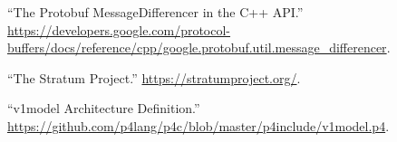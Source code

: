 \documentclass[11pt]{article}
\begin{document}
{{\begin{thebibliography}{45}
\mdbibitemlabel{{}[42]}\textquotedblleft{}The Protobuf MessageDifferencer in the C++ API.\textquotedblright{} \href{https://developers.google.com/protocol-buffers/docs/reference/cpp/google.protobuf.util.message_differencer}{{\ttfamily https://\hspace{0pt}developers.\hspace{0pt}google.\hspace{0pt}com/\hspace{0pt}protocol-\hspace{0pt}buffers/\hspace{0pt}docs/\hspace{0pt}reference/\hspace{0pt}cpp/\hspace{0pt}google.\hspace{0pt}protobuf.\hspace{0pt}util.\hspace{0pt}message\_\hspace{0pt}differencer}}.\label{protomessagedifferencer}%

\mdbibitemlabel{{}[43]}\textquotedblleft{}The Stratum Project.\textquotedblright{} \href{https://stratumproject.org/}{{\ttfamily https://\hspace{0pt}stratumproject.\hspace{0pt}org/\hspace{0pt}}}.\label{stratum}%

\mdbibitemlabel{{}[44]}\textquotedblleft{}v1model Architecture Definition.\textquotedblright{} \href{https://github.com/p4lang/p4c/blob/master/p4include/v1model.p4}{{\ttfamily https://\hspace{0pt}github.\hspace{0pt}com/\hspace{0pt}p4lang/\hspace{0pt}p4c/\hspace{0pt}blob/\hspace{0pt}master/\hspace{0pt}p4include/\hspace{0pt}v1model.\hspace{0pt}p4}}.\label{v1model}%


\end{thebibliography}}}
\end{document}
